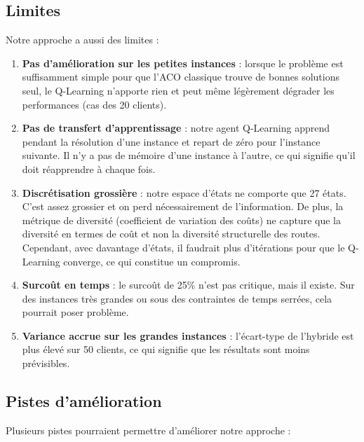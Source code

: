 \documentclass[12pt, a4paper]{article}
\begin{document}
\subsection{Limites}

Notre approche a aussi des limites :

\begin{enumerate}
    \item \textbf{Pas d'amélioration sur les petites instances} : lorsque le problème est suffisamment simple pour que l'ACO classique trouve de bonnes solutions seul, le Q-Learning n'apporte rien et peut même légèrement dégrader les performances (cas des 20 clients).

    \item \textbf{Pas de transfert d'apprentissage} : notre agent Q-Learning apprend pendant la résolution d'une instance et repart de zéro pour l'instance suivante. Il n'y a pas de mémoire d'une instance à l'autre, ce qui signifie qu'il doit réapprendre à chaque fois.

    \item \textbf{Discrétisation grossière} : notre espace d'états ne comporte que 27 états. C'est assez grossier et on perd nécessairement de l'information. De plus, la métrique de diversité (coefficient de variation des coûts) ne capture que la diversité en termes de coût et non la diversité structurelle des routes. Cependant, avec davantage d'états, il faudrait plus d'itérations pour que le Q-Learning converge, ce qui constitue un compromis.

    \item \textbf{Surcoût en temps} : le surcoût de 25\% n'est pas critique, mais il existe. Sur des instances très grandes ou sous des contraintes de temps serrées, cela pourrait poser problème.

    \item \textbf{Variance accrue sur les grandes instances} : l'écart-type de l'hybride est plus élevé sur 50 clients, ce qui signifie que les résultats sont moins prévisibles.
\end{enumerate}

\subsection{Pistes d'amélioration}

Plusieurs pistes pourraient permettre d'améliorer notre approche :
\end{document}
